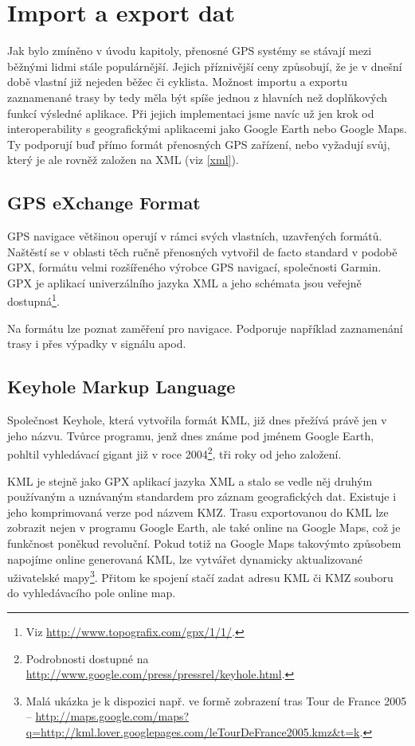 \section{Import a export dat}
Jak bylo zmíněno v úvodu kapitoly, přenosné GPS systémy se stávají
mezi běžnými lidmi stále populárnější. Jejich příznivější ceny
způsobují, že je v dnešní době vlastní již nejeden běžec či cyklista.
Možnost importu a exportu zaznamenané trasy by tedy měla být spíše
jednou z hlavních než doplňkových funkcí výsledné aplikace. Při
jejich implementaci jsme navíc už jen krok od interoperability s
geografickými aplikacemi jako Google Earth nebo Google Maps. Ty
podporují buď přímo formát přenosných GPS zařízení, nebo vyžadují
svůj, který je ale rovněž založen na XML (viz \ref{xml}).

\subsection{GPS eXchange Format}
GPS navigace většinou operují v rámci svých vlastních, uzavřených
formátů. Naštěstí se v oblasti těch ručně přenosných vytvořil de
facto standard v podobě GPX, formátu velmi rozšířeného výrobce GPS
navigací, společnosti Garmin. GPX je aplikací univerzálního jazyka
XML a jeho schémata jsou veřejně dostupná\footnote{Viz
\url{http://www.topografix.com/gpx/1/1/}.}.

Na formátu lze poznat zaměření pro navigace. Podporuje například
zaznamenání trasy i přes výpadky v signálu apod.

\subsection{Keyhole Markup Language}
Společnost Keyhole, která vytvořila formát KML, již dnes přežívá
právě jen v jeho názvu. Tvůrce programu, jenž dnes známe pod jménem
Google Earth, pohltil vyhledávací gigant již v roce
2004\footnote{Podrobnosti dostupné na
\url{http://www.google.com/press/pressrel/keyhole.html}.}, tři roky od
jeho založení.

KML je stejně jako GPX aplikací jazyka XML a stalo se vedle něj
druhým používaným a uznávaným standardem pro záznam geografických
dat. Existuje i jeho komprimovaná verze pod názvem KMZ. Trasu
exportovanou do KML lze zobrazit nejen v programu Google Earth, ale
také online na Google Maps, což je funkčnost poněkud revoluční. Pokud
totiž na Google Maps takovýmto způsobem napojíme online generovaná
KML, lze vytvářet dy\-na\-mic\-ky aktualizované uživatelské
mapy\footnote{Malá ukázka je k dispozici např. ve formě zobrazení tras Tour de France
2005 --
\url{http://maps.google.com/maps?q=http://kml.lover.googlepages.com/leTourDeFrance2005.kmz&t=k}.}.
Přitom ke spojení stačí zadat adresu KML či KMZ souboru do vyhledávacího pole online map.

